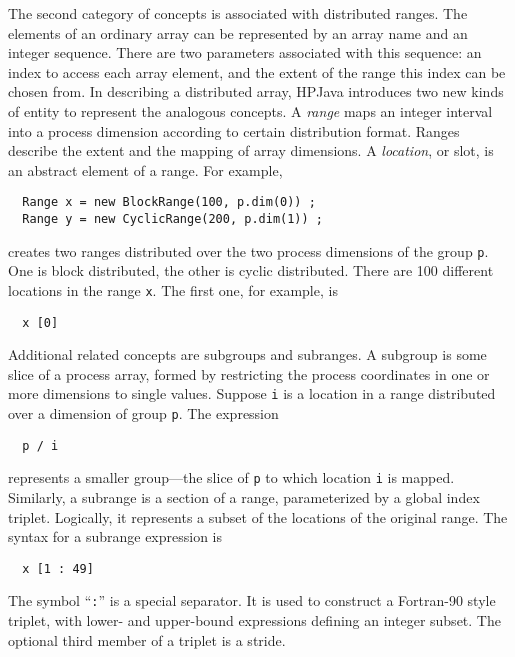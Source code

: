 The second category of concepts is associated with 
distributed ranges.
The elements of an ordinary array can be represented by an array name and
an integer sequence.  There are two parameters associated with this
sequence: an index to access each array element, and the extent of the
range this index can be chosen from.  In describing a distributed
array, HPJava introduces two new kinds of entity to represent the
analogous concepts.  A {\em range} maps an integer interval into a
process dimension according to certain distribution format. Ranges
describe the extent and the mapping of array dimensions.  A {\em
location}, or slot, is an abstract element of a range.
For example,
\small
\begin{verbatim}
  Range x = new BlockRange(100, p.dim(0)) ;
  Range y = new CyclicRange(200, p.dim(1)) ;
\end{verbatim}
\normalsize
creates two ranges distributed over the two process dimensions of the
group \texttt{p}.  One is block distributed, the other is cyclic
distributed.  There are 100 different locations in the range \texttt{x}.
The first one, for example, is
\small
\begin{verbatim}
  x [0]
\end{verbatim}
\normalsize

Additional related concepts are 
subgroups
and 
subranges.  A subgroup is some slice of a
process array, formed by restricting the process coordinates in one or
more dimensions to single values.  Suppose {\tt i} is a location in a
range distributed over a dimension of group {\tt p}. The expression
\small
\begin{verbatim}
  p / i
\end{verbatim}
\normalsize
represents a smaller group---the slice of {\tt p} to which location
{\tt i} is mapped.  
Similarly, a subrange is a section of a range, parameterized by
a global index triplet. Logically, it represents a subset of the
locations of the original range.
The syntax for a subrange expression is
\small
\begin{verbatim}
  x [1 : 49]
\end{verbatim}
\normalsize
The symbol ``\texttt{:}'' is a special separator.  It is used to
construct a Fortran-90 style triplet, with lower- and upper-bound
expressions defining an integer subset.  The optional third member of a
triplet is a stride.

